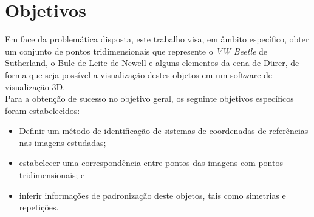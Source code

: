 \section{Objetivos}

	Em face da problemática disposta, este trabalho visa, em âmbito específico, obter um conjunto de pontos tridimensionais que represente o \textit{VW Beetle} de Sutherland, o Bule de Leite de Newell e alguns elementos da cena de Dürer, de forma que seja possível a visualização destes objetos em um software de visualização 3D. \\
	Para a obtenção de sucesso no objetivo geral, os seguinte objetivos específicos foram estabelecidos:
	\begin{itemize}
		\item Definir um método de identificação de sistemas de coordenadas de referências nas imagens estudadas;
		\item estabelecer uma correspondência entre pontos das imagens com pontos tridimensionais; e
		\item inferir informações de padronização deste objetos, tais como simetrias e repetições.
	\end{itemize}